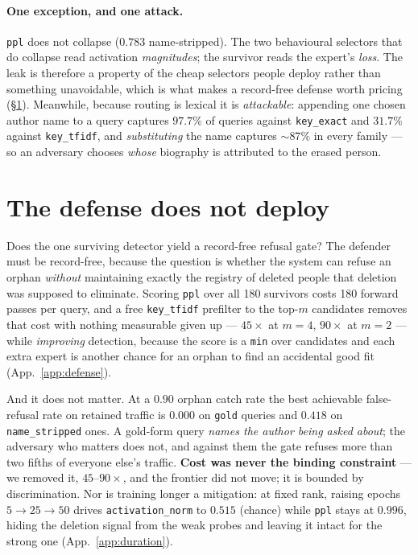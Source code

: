 \documentclass{article}
\begin{document}
\paragraph{One exception, and one attack.} \texttt{ppl} does not collapse ($0.783$ name-stripped).
The two behavioural selectors that do collapse read activation \emph{magnitudes}; the survivor
reads the expert's \emph{loss}. The leak is therefore a property of the cheap selectors people
deploy rather than something unavoidable, which is what makes a record-free defense worth pricing
(\S\ref{sec:defense}). Meanwhile, because routing is lexical it is \emph{attackable}: appending one
chosen author name to a query captures $97.7\%$ of queries against \texttt{key\_exact} and $31.7\%$
against \texttt{key\_tfidf}, and \emph{substituting} the name captures ${\sim}87\%$ in every family
--- so an adversary chooses \emph{whose} biography is attributed to the erased person.

\section{The defense does not deploy}
\label{sec:defense}

Does the one surviving detector yield a record-free refusal gate? The defender must be
record-free, because the question is whether the system can refuse an orphan \emph{without}
maintaining exactly the registry of deleted people that deletion was supposed to eliminate. Scoring
\texttt{ppl} over all 180 survivors costs 180 forward passes per query, and a free
\texttt{key\_tfidf} prefilter to the top-$m$ candidates removes that cost with nothing measurable
given up --- $45\times$ at $m=4$, $90\times$ at $m=2$ --- while \emph{improving} detection, because
the score is a \texttt{min} over candidates and each extra expert is another chance for an orphan
to find an accidental good fit (App.~\ref{app:defense}).

And it does not matter. At a $0.90$ orphan catch rate the best achievable false-refusal rate on
retained traffic is $0.000$ on \texttt{gold} queries and $0.418$ on \texttt{name\_stripped} ones. A
gold-form query \emph{names the author being asked about}; the adversary who matters does not, and
against them the gate refuses more than two fifths of everyone else's traffic. \textbf{Cost was
never the binding constraint} --- we removed it, $45$--$90\times$, and the frontier did not move; it
is bounded by discrimination. Nor is training longer a mitigation: at fixed rank, raising epochs $5
\to 25 \to 50$ drives \texttt{activation\_norm} to $0.515$ (chance) while \texttt{ppl} stays at
$0.996$, hiding the deletion signal from the weak probes and leaving it intact for the strong one
(App.~\ref{app:duration}).
\end{document}
